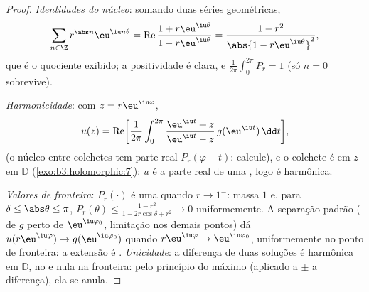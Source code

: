 \begin{proof}
\emph{Identidades do núcleo}: somando duas séries geométricas,
\[
\sum_{n\in\Z}r^{\abs n}\eu^{\iu n\theta}
= \operatorname{Re}\frac{1 + r\eu^{\iu\theta}}{1 -
r\eu^{\iu\theta}}
= \frac{1 - r^2}{\abs{1 - r\eu^{\iu\theta}}^2},
\]
que é o quociente exibido; a positividade é clara, e $\frac1{2\pi}\int_0^{2\pi}P_r = 1$ (só $n = 0$
sobrevive).

\emph{Harmonicidade}: com $z = r\eu^{\iu\varphi}$,
\[
u(z) = \operatorname{Re}\biggl[\frac1{2\pi}\int_0^{2\pi}
\frac{\eu^{\iu t} + z}{\eu^{\iu t} - z}\,
g(\eu^{\iu t})\,\dd t\biggr],
\]
(o núcleo entre colchetes tem parte real $P_r(\varphi - t)$: calcule), e o colchete é
 em $z$ em $\mathbb D$ (\cref{exo:b3:holomorphic:7}): $u$ é a parte real de
uma , logo é harmônica.

\emph{Valores de fronteira}: $P_r(\cdot)$ é uma 
quando $r \to 1^-$: massa $1$ e, para $\delta \leq
\abs\theta \leq \pi$, $P_r(\theta) \leq \frac{1 - r^2}{1 -
2r\cos\delta + r^2} \to 0$ uniformemente. A
separação padrão ( de $g$ perto de $\eu^{\iu\varphi_0}$, limitação nos
demais pontos) dá $u(r\eu^{\iu\varphi}) \to
g(\eu^{\iu\varphi_0})$ quando $r\eu^{\iu\varphi} \to
\eu^{\iu\varphi_0}$, uniformemente no ponto de
fronteira: a extensão é . \emph{Unicidade}: a diferença de duas
soluções é harmônica em $\mathbb D$,  no  e nula na fronteira:
pelo princípio do máximo (aplicado a $\pm$ a diferença), ela se
anula.
\end{proof}

